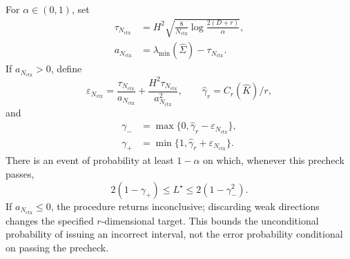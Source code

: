 \begin{spectraltheorem}
\label{sp:finite}
For $\alpha\in(0,1)$, set
\[
 \begin{aligned}
 \tau_{N_{\mathrm{ctx}}}
 &=
 H^2
 \sqrt{
 \frac8{N_{\mathrm{ctx}}}
 \log\frac{2(D+r)}\alpha
 },
 \\
 a_{N_{\mathrm{ctx}}}
 &=
 \lambda_{\min}(\widehat\Sigma)
 -
 \tau_{N_{\mathrm{ctx}}}.
 \end{aligned}
\]
If $a_{N_{\mathrm{ctx}}}>0$, define
\[
 \varepsilon_{N_{\mathrm{ctx}}}
 =
 \frac{\tau_{N_{\mathrm{ctx}}}}{a_{N_{\mathrm{ctx}}}}
 +
 \frac{H^2\tau_{N_{\mathrm{ctx}}}}{a_{N_{\mathrm{ctx}}}^2},
 \qquad
 \widehat\gamma_r=C_r(\widehat K)/r,
\]
and
\[
 \begin{aligned}
 \gamma_-
 &=
 \max\{
 0,\widehat\gamma_r-\varepsilon_{N_{\mathrm{ctx}}}
 \},
 \\
 \gamma_+
 &=
 \min\{
 1,\widehat\gamma_r+\varepsilon_{N_{\mathrm{ctx}}}
 \}.
 \end{aligned}
\]
There is an event of probability at least $1-\alpha$ on which, whenever this precheck passes,
\begin{equation}
 2(1-\gamma_+)\le L^\star\le2(1-\gamma_-^2).
 \label{sp:confidence}
\end{equation}
If $a_{N_{\mathrm{ctx}}}\le0$, the procedure returns inconclusive; discarding weak directions changes the specified $r$-dimensional target. This bounds the unconditional probability of issuing an incorrect interval, not the error probability conditional on passing the precheck.
\end{spectraltheorem}
